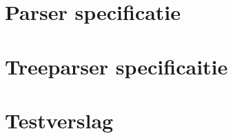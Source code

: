 \clearpage

\section{Parser specificatie} %
\label{sec:parser_specificatie}


\section{Treeparser specificaitie} %
\label{sec:treeparser_specificaitie}


\section{Testverslag} %
\label{sec:testverslag}


\clearpage